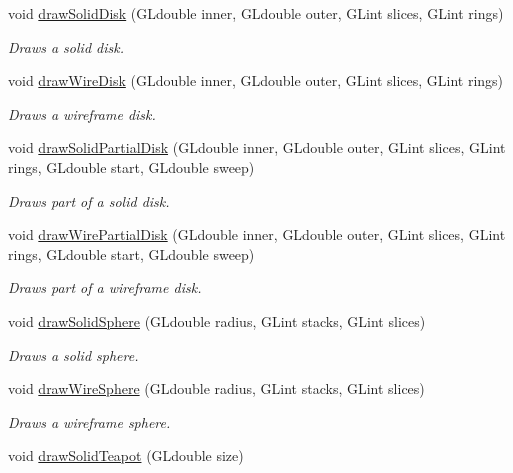 \begin{DoxyCompactItemize}
void \hyperlink{namespace_c_s_c_i441_a9bc98669fe2b67ecb45d7b18c61f74d9}{draw\+Solid\+Disk} (G\+Ldouble inner, G\+Ldouble outer, G\+Lint slices, G\+Lint rings)
\begin{DoxyCompactList}\small\item\em Draws a solid disk. \end{DoxyCompactList}\item 
void \hyperlink{namespace_c_s_c_i441_aef50f552e509fea9c7a76ca35d177e83}{draw\+Wire\+Disk} (G\+Ldouble inner, G\+Ldouble outer, G\+Lint slices, G\+Lint rings)
\begin{DoxyCompactList}\small\item\em Draws a wireframe disk. \end{DoxyCompactList}\item 
void \hyperlink{namespace_c_s_c_i441_ac5294402a29a9a5628544e40eacabf67}{draw\+Solid\+Partial\+Disk} (G\+Ldouble inner, G\+Ldouble outer, G\+Lint slices, G\+Lint rings, G\+Ldouble start, G\+Ldouble sweep)
\begin{DoxyCompactList}\small\item\em Draws part of a solid disk. \end{DoxyCompactList}\item 
void \hyperlink{namespace_c_s_c_i441_aeacfcb84e2c6b2e8a2dcb9e15ba59bd1}{draw\+Wire\+Partial\+Disk} (G\+Ldouble inner, G\+Ldouble outer, G\+Lint slices, G\+Lint rings, G\+Ldouble start, G\+Ldouble sweep)
\begin{DoxyCompactList}\small\item\em Draws part of a wireframe disk. \end{DoxyCompactList}\item 
void \hyperlink{namespace_c_s_c_i441_a4b017bdc6d956d3f4f3dffefa30411a7}{draw\+Solid\+Sphere} (G\+Ldouble radius, G\+Lint stacks, G\+Lint slices)
\begin{DoxyCompactList}\small\item\em Draws a solid sphere. \end{DoxyCompactList}\item 
void \hyperlink{namespace_c_s_c_i441_aa9a493af03829b36099728f10cb0fdb4}{draw\+Wire\+Sphere} (G\+Ldouble radius, G\+Lint stacks, G\+Lint slices)
\begin{DoxyCompactList}\small\item\em Draws a wireframe sphere. \end{DoxyCompactList}\item 
void \hyperlink{namespace_c_s_c_i441_a89b924cd4a8bab98cb115988dacadfe7}{draw\+Solid\+Teapot} (G\+Ldouble size)

\end{DoxyCompactItemize}
